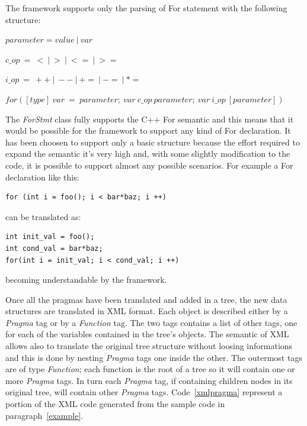 \documentclass[a4paper,11pt,oneside]{book}
\begin{document}
The framework supports only the parsing of For statement with the following structure: \newline

$parameter = value \ | \ var$

$c\_op \ = \ < \ | \ > \ | \ <= \ | \ >= $

$i\_op \ = \ ++ \ | \ -- \ | \ += \ | \ -= \ | \ *=$ 

$for([type] \ var \ = \ parameter; \ var \ c\_op \ parameter; \ var \ i\_op \ [parameter])$ \newline


The \emph{ForStmt} class fully supports the C++ For semantic and this means that it would be possible for the framework to support any kind of For declaration. It has been choosen to support only a basic structure because the effort required to expand the semantic it’s very high and, with some slightly modification to the code, it is possible to support almost any possible scenarios. For example a For declaration like this: \\

\begin{lstlisting}[language=CCC]
for (int i = foo(); i < bar*baz; i ++)
\end{lstlisting} 
can be translated as: \\

\begin{lstlisting}[language=CCC]
int init_val = foo();
int cond_val = bar*baz;
for(int i = init_val; i < cond_val; i ++)  
\end{lstlisting}
becoming understandable by the framework.

Once all the pragmas have been translated and added in a tree, the new data structures are translated in XML format. Each object is described either by a \emph{Pragma} tag or by a \emph{Function} tag. The two tags contains a list of other tags, one for  each of the variables contained in the tree’s objects. The semantic of XML allows also to translate the original tree structure without loosing informations and this is done by nesting \emph{Pragma} tags one inside the other. The outermost tags are of type \emph{Function}; each function is the root of a tree so it will contain one or more \emph{Pragma} tags. In turn each \emph{Pragma} tag, if containing children nodes in its original tree, will contain other \emph{Pragma} tags. Code~\ref{xmlpragma} represent a portion of the XML code generated from the sample code in paragraph~\ref{example}.
\end{document}
